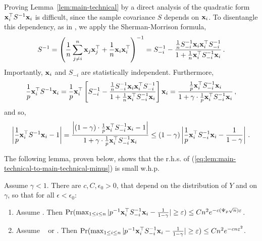 \documentclass[times,sort&compress,3p]{elsarticle}
\begin{document}
Proving Lemma~\ref{lem:main-technical} by a direct analysis of the quadratic form ${\bf x}_i^\top S^{-1}{\bf x}_i$ is difficult, since the sample covariance $S$ depends on ${\bf x}_i$.
To disentangle this dependency, as in \cite{couillet2014robust}, we apply the Sherman-Morrison formula,
\begin{equation}
\begin{aligned}S^{-1}
= \left(\frac{1}{n}\sum_{j\ne i}^{n}
{\bf x}_j{\bf x}_j^{\top}+\frac{1}{n}{\bf x}_{i}{\bf x}_{i}^{\top}\right)^{-1}
= S_{-i}^{-1}-\frac{\frac{1}{n}S_{-i}^{-1}{\bf x}_{i}{\bf x}_{i}^{\top}S_{-i}^{-1}}{1+\frac1n {\bf x}_{i}^{\top}S_{-i}^{-1}{\bf x}_{i}}\,.
\end{aligned}
        \nonumber
\end{equation}
Importantly, ${\bf x}_i$ and $S_{-i}$ are  statistically independent. 
Furthermore, 
\begin{align}
\label{eq:relation_sherman_morrison}
\frac{1}{p}{\bf x}_i^{\top}S^{-1}{\bf x}_i = 
\frac{1}{p}{\bf x}_i^\top\left[S_{-i}^{-1}-\frac{\frac{1}{n}S_{-i}^{-1}{\bf x}_{i}{\bf x}_{i}^{\top}S_{-i}^{-1}}{1+\frac1n {\bf x}_{i}^{\top}S_{-i}^{-1}{\bf x}_{i}} \right]{\bf x}_i
= \frac{\frac{1}{p}{\bf x}^{\top}_iS_{-i}^{-1}{\bf x}_i}{1+\gamma\cdot \frac1p {\bf x}_{i}^{\top}S_{-i}^{-1}{\bf x}_{i}}\,,
\end{align}
and so,
\begin{align}\label{eq:lem:main-technical-to-main-technical-minus}
        \left \vert  \frac{1}{p}{\bf x}_i^{\top}S^{-1}{\bf x}_i - 1 \right \vert
        = \frac{ \left \vert (1-\gamma)\cdot \frac{1}{p}{\bf x}^{\top}_iS_{-i}^{-1}{\bf x}_i - 1 \right \vert}{1+\gamma\cdot \frac1p {\bf x}_{i}^{\top}S_{-i}^{-1}{\bf x}_{i}}  
        \le (1-\gamma)\left \vert \frac{1}{p}{\bf x}^{\top}_iS_{-i}^{-1}{\bf x}_i - \frac{1}{1-\gamma} \right \vert \,.
\end{align}

The following lemma, proven below, shows that the r.h.s. of (\ref{eq:lem:main-technical-to-main-technical-minus}) is small w.h.p.
\begin{lemma}\label{lem:main-technical-minus-i}   
            Assume  $\gamma<1$. There are 
        $c,C,\epsilon_0>0$, that depend on the distribution of $Y$ and on $\gamma$, so that for all $\epsilon<\epsilon_0$:
        \begin{enumerate}
                
                \item 
                Assume \AssumLC. Then 
                $\Pr(\max_{1\le i \le n}|p^{-1}{\bf x}_i^\top S_{-i}^{-1}{\bf x}_i - \frac{1}{1-\gamma}|\ge \varepsilon) \le Cn^2e^{-c(\Psi_p\sqrt{n}) \varepsilon}$.
                
                
                \item     
                Assume \AssumIndep~ or \AssumCCPSB. Then 
                $\Pr(\max_{1\le i \le n}|p^{-1}{\bf x}_i^\top S_{-i}^{-1}{\bf x}_i - \frac{1}{1-\gamma}|\ge \varepsilon) \le C n^2 e^{-cn\varepsilon^2}$.
        \end{enumerate}
\end{lemma}
\end{document}
